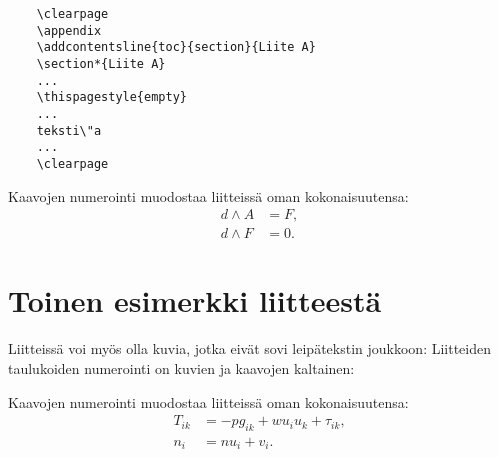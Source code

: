 \documentclass[english, 12pt, a4paper, elec, utf8, a-1b, online]{aaltothesis}
\begin{document}
\begin{verbatim}
	\clearpage
	\appendix
	\addcontentsline{toc}{section}{Liite A}
	\section*{Liite A}
	...
	\thispagestyle{empty}
	...
	teksti\"a
	...
	\clearpage
\end{verbatim}

Kaavojen numerointi muodostaa liitteiss\"a oman kokonaisuutensa:
\begin{align}
d \wedge A &= F, \label{liitekaava1}\\
d \wedge F &= 0. \label{liitekaava2}
\end{align}


\clearpage
\section{Toinen esimerkki liitteest\"a\label{LiiteB}}


Liitteiss\"a voi my\"os olla kuvia, jotka
eiv\"at sovi leip\"atekstin joukkoon:
Liitteiden taulukoiden numerointi on kuvien ja kaavojen kaltainen:
\begin{table}[htb]
\caption{Taulukon kuvateksti.}
\label{liitetaulukko}
\begin{center}
\end{center}
\end{table}
Kaavojen numerointi muodostaa liitteiss\"a oman kokonaisuutensa:
\begin{align}
T_{ik} &= -p g_{ik} + w u_i u_k + \tau_{ik},  \label{liitekaava3} \\
n_i    &= n u_i + v_i.                      \label{liitekaava4}
\end{align}
\end{document}
